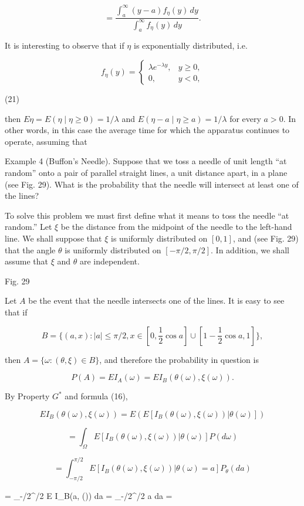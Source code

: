 $$= \frac{\int_{a}^{\infty}(y - a)f_{\eta}(y) \, dy}{\int_{a}^{\infty}f_{\eta}(y) \, dy}.$$

It is interesting to observe that if $\eta$ is exponentially distributed, i.e.

$$f_{\eta}(y) = \begin{cases} \lambda e^{-\lambda y}, & y \geq 0, \\ 0, & y < 0, \end{cases}$$

(21)

then $E \eta = E(\eta \mid \eta \geq 0) = 1/\lambda$ and $E(\eta - a \mid \eta \geq a) = 1/\lambda$ for every $a > 0$. In other words, in this case the average time for which the apparatus continues to operate, assuming that

Example 4 (Buffon’s Needle). Suppose that we toss a needle of unit length “at random” onto a pair of parallel straight lines, a unit distance apart, in a plane (see Fig. 29). What is the probability that the needle will intersect at least one of the lines?

To solve this problem we must first define what it means to toss the needle “at random.” Let $\xi$ be the distance from the midpoint of the needle to the left-hand line. We shall suppose that $\xi$ is uniformly distributed on $[0, 1]$, and (see Fig. 29) that the angle $\theta$ is uniformly distributed on $[-\pi/2, \pi/2]$. In addition, we shall assume that $\xi$ and $\theta$ are independent.

Fig. 29

Let $A$ be the event that the needle intersects one of the lines. It is easy to see that if

$$B = \{(a, x) : |a| \leq \pi/2, x \in [0, \frac{1}{2} \cos a] \cup [1 - \frac{1}{2} \cos a, 1]\},$$

then $A = \{\omega : (\theta, \xi) \in B\}$, and therefore the probability in question is

$$P(A) = E I_A(\omega) = E I_B(\theta(\omega), \xi(\omega)).$$

By Property $G^*$ and formula (16),

$$E I_B(\theta(\omega), \xi(\omega)) = E(E[I_B(\theta(\omega), \xi(\omega)) | \theta(\omega)])$$

$$= \int_{\Omega} E[I_B(\theta(\omega), \xi(\omega)) | \theta(\omega)] P(d\omega)$$

$$= \int_{-\pi/2}^{\pi/2} E[I_B(\theta(\omega), \xi(\omega)) | \theta(\omega) = a] P_{\theta}(da)$$

$$=  \int_{-\pi/2}^{\pi/2} E I_B(a, \xi(\omega)) da =  \int_{-\pi/2}^{\pi/2} \cos a da = \frac

